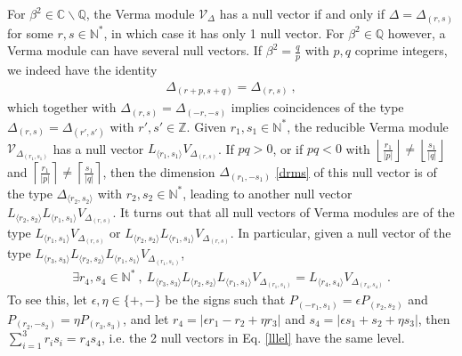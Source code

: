 \documentclass[12pt, a4paper]{article}
\theoremstyle{break}
\begin{document}
For $\beta^2\in\mathbb{C}\backslash \mathbb{Q}$, the Verma module $\mathcal{V}_\Delta$ has a null vector if and only if $\Delta=\Delta_{(r, s)}$ for some $r,s\in\mathbb{N}^*$, in which case it has only 1 null vector. For $\beta^2\in\mathbb{Q}$ however, a Verma module can have several null vectors. If $\beta^2 = \frac{q}{p}$ with $p,q$ coprime integers, we indeed have the identity
\begin{align}
 \Delta_{(r+p,s+q)} = \Delta_{(r,s)}\ ,
 \label{rpsq}
\end{align}
which together with $\Delta_{(r,s)}=\Delta_{(-r,-s)}$ implies coincidences of the type $\Delta_{(r,s)}=\Delta_{(r',s')}$ with $r',s'\in\mathbb{Z}$. 
Given $r_1,s_1\in \mathbb{N}^*$, the reducible Verma module $\mathcal{V}_{\Delta_{(r_1,s_1)}}$ has a null vector $L_{\langle r_1,s_1\rangle} V_{\Delta_{(r,s)}}$. If $pq>0$, or if $pq<0$ with $\left\lfloor \frac{r_1}{|p|}\right\rfloor \neq \left\lfloor \frac{s_1}{|q|}\right\rfloor$ and $\left\lceil \frac{r_1}{|p|}\right\rceil \neq \left\lceil \frac{s_1}{|q|}\right\rceil$, then the dimension $\Delta_{(r_1,-s_1)}$ \eqref{drms} of this null vector is of the type $\Delta_{\langle r_2,s_2\rangle}$ with $r_2,s_2\in\mathbb{N}^*$, leading to another null vector $L_{\langle r_2,s_2\rangle}L_{\langle r_1,s_1\rangle} V_{\Delta_{(r,s)}}$. 
It turns out that all null vectors of Verma modules are of the type $L_{\langle r_1,s_1\rangle} V_{\Delta_{(r,s)}}$ or $L_{\langle r_2,s_2\rangle}L_{\langle r_1,s_1\rangle} V_{\Delta_{(r,s)}}$. In particular, given a null vector of the type $L_{\langle r_3,s_3\rangle}L_{\langle r_2,s_2\rangle}L_{\langle r_1,s_1\rangle} V_{\Delta_{(r_1,s_1)}}$, 
\begin{align}
 \exists r_4,s_4\in \mathbb{N}^*\ , \ L_{\langle r_3,s_3\rangle}L_{\langle r_2,s_2\rangle}L_{\langle r_1,s_1\rangle} V_{\Delta_{(r_1,s_1)}} = L_{\langle r_4,s_4\rangle} V_{\Delta_{(r_4,s_4)}}\ .
 \label{lllel}
\end{align}
To see this, let $\epsilon,\eta\in\{+,-\}$ be the signs such that $P_{(-r_1,s_1)}=\epsilon P_{(r_2,s_2)}$ and $P_{(r_2,-s_2)}=\eta P_{(r_3,s_3)}$, and let $r_4=|\epsilon r_1-r_2+\eta r_3|$ and $s_4=|\epsilon s_1+s_2+\eta s_3|$, then $\sum_{i=1}^3 r_is_i=r_4s_4$, i.e. the 2 null vectors in Eq. \eqref{lllel} have the same level. 
\end{document}
